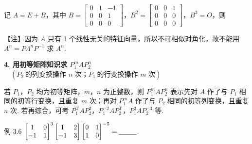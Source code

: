 记 $A=E+B$，其中 $B=\begin{bmatrix}0&1&-1\\0&0&1\\0&0&0\end{bmatrix}$，$B^2=\begin{bmatrix}0&0&1\\0&0&0\\0&0&0\end{bmatrix}$，$B^3=O$，则

\begin{fnote}
【注】因为 $A$ 只有 1 个线性无关的特征向量，所以不可相似对角化，故不能用 $A^n=P\Lambda^nP^{-1}$ 求 $A^n$.
\end{fnote}


\textbf{4. 用初等矩阵知识求 $P_1^mAP_2^n$} $\quad(P_2\ \text{的列变换操作 }n\text{ 次；}P_1\ \text{的行变换操作 }m\text{ 次})$

若 $P_1$，$P_2$ 均为初等矩阵，$m$，$n$ 为正整数，则 $P_1^mAP_2^n$ 表示先对 $A$ 作了与 $P_1$ 相同的初等行变换，且重复 $m$ 次；再对 $P_1^mA$ 作了与 $P_2$ 相同的初等列变换，且重复 $n$ 次. 若再综合，可考 $P_1^{\mathrm T}AP_2^2$，$P_1^{-2}AP_2^{\mathrm T}$，$P_1^3AP_2^{-3}$ 等.

\begin{fcard}{例 3.6}
$\begin{bmatrix}1&0\\-1&1\end{bmatrix}^3\begin{bmatrix}1&2\\-1&3\end{bmatrix}\begin{bmatrix}0&1\\1&0\end{bmatrix}^{-5}=\underline{\hspace{2.6em}}$.
\end{fcard}


